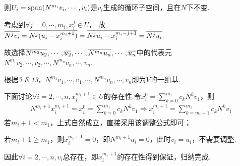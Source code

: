 则\(U_i=\mathrm{span}(N^{m_i}v_i,\cdots,v_i)\)是\(v_i\)生成的循环子空间，且在\(N\)下不变.

考虑到\(\forall j=0,\cdots,m_i,x_i^j \in U\)，
故\(\overline{N^jv_i}=\overline{N^j(u_i-x_i^{m_i+1})}=\overline{N^ju_i-x_i^{m_i-j+1}}=\overline{N^ju_i}\).

故选择\(\overline{N^{m_2}u_2},\cdots,\overline{u_2},\cdots,\overline{N^{m_n}u_n},\cdots,\overline{u_n}\)中的代表元
\(N^{m_1}v_2,\cdots,v_2,\cdots,N^{m_n}v_n,\cdots,v_n\).

根据\textit{3.E.13}，\(N^{m_1}v_1,\cdots,v_1,\cdots,N^{m_n}v_n,\cdots,v_n\)即为\(V\)的一组基.

下面讨论\(\forall i=2,\cdots,n,x_i^{m_i+1} \in U\)的存在性.令\(x_i^0=\sum_{k=0}^{m_1}c_kN^kv_1\)，则
    \begin{align*}
        N^{m_i+1}x_i^{m_i+1}=x_i^0=\sum_{k=0}^{m_1}c_kN^k v_1 \Rightarrow x_i^{m_i+1}=\sum_{k=m_i+1}^{m_1}c_kN^k v_1
    \end{align*}
若\(m_i+1<m_1\)，上式自然成立，直接采用该调整公式即可；

若\(m_i+1 \geq m_1\)，则\(x_i^{m_i+1}=0\)，即\(N^{m_i+1}u_i=0\)，此时\(v_i=u_i\)，不需要调整.

因此\(\forall i=2,\cdots,n,v_i\)总存在，即\(x_i^{m_i+1}\)的存在性得到保证，归纳完成.

